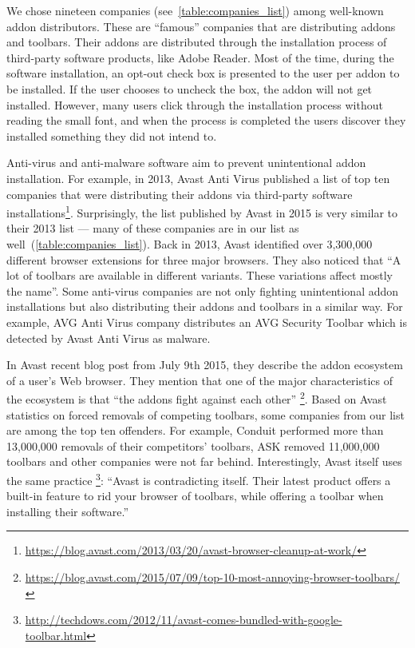 \documentclass[11pt,oneside]{book}
\let\Oldsection\section
\renewcommand{\section}{\FloatBarrier\Oldsection}
\begin{document}

We chose nineteen companies (see~\autoref{table:companies_list}) among well-known addon distributors. These are ``famous'' companies that are distributing addons and toolbars. Their addons are distributed through the installation process of third-party software products, like Adobe Reader. Most of the time, during the software installation, an opt-out check box is presented to the user per addon to be installed. If the user chooses to uncheck the box, the addon will not get installed. However, many users click through the installation process without reading the small font, and when the process is completed the users discover they installed something they did not intend to. 

Anti-virus and anti-malware software aim to prevent unintentional addon installation. For example, in 2013, Avast Anti Virus published a list of top ten companies that were distributing their addons via third-party software installations\footnote{\url{https://blog.avast.com/2013/03/20/avast-browser-cleanup-at-work/}}. Surprisingly, the list published by Avast in 2015 is very similar to their 2013 list --- many of these companies are in our list as well~(\autoref{table:companies_list}). Back in 2013, Avast identified over 3,300,000 different browser extensions for three major browsers. They also noticed that ``A lot of toolbars are available in different variants. These variations affect mostly the name''. Some anti-virus companies are not only fighting unintentional addon installations but also distributing their addons and toolbars in a similar way. For example, AVG Anti Virus company distributes an AVG Security Toolbar which is detected by Avast Anti Virus as malware. 

In Avast recent blog post from July 9th 2015, they describe the addon ecosystem of a user's Web browser. They mention that one of the major characteristics of the ecosystem is that ``the addons fight against each other'' \footnote{\url{https://blog.avast.com/2015/07/09/top-10-most-annoying-browser-toolbars/}}.
Based on Avast statistics on forced removals of competing toolbars, some companies from our list are among the top ten offenders. For example, Conduit performed more than 13,000,000 removals of their competitors' toolbars, ASK removed 11,000,000 toolbars and other companies were not far behind. Interestingly, Avast itself uses the same practice \footnote{\url{http://techdows.com/2012/11/avast-comes-bundled-with-google-toolbar.html}}: ``Avast is contradicting itself. Their latest product offers a built-in feature to rid your browser of toolbars, while offering a toolbar when installing their software.''
\end{document}

